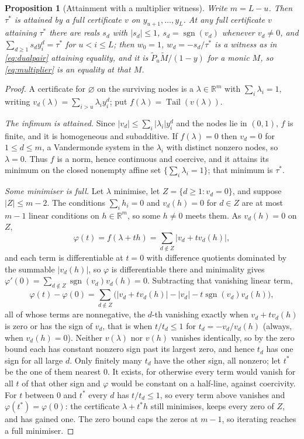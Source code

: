 \documentclass[11pt]{article}
\newtheorem{proposition}[theorem]{Proposition}
\theoremstyle{definition}
\theoremstyle{plain}
\newcommand{\R}{\mathbb R}
\DeclareMathOperator{\Tail}{Tail}
\DeclareMathOperator{\sgn}{sgn}
\begin{document}
\begin{proposition}[Attainment with a multiplier witness]\label{prop:attain}
Write $m=L-u$.  Then $\tau^*$ is attained by a full certificate $v$ on
$y_{u+1},\ldots,y_L$.  At any full certificate $v$ attaining $\tau^*$ there are reals $s_d$ with
$|s_d|\le1$, $s_d=\sgn(v_d)$ whenever $v_d\ne0$, and
$\sum_{d\ge1}s_dy_i^d=\tau^*$ for $u<i\le L$; then $w_0=1$,
$w_d=-s_d/\tau^*$ is a witness as in \eqref{eq:dualpair} attaining equality,
and it is $\widetilde P_u\widetilde M/(1-y)$ for a monic $M$, so
\eqref{eq:multiplier} is an equality at that $M$.
\end{proposition}

\begin{proof}
A certificate for $\varnothing$ on the surviving nodes is a
$\lambda\in\R^m$ with $\sum_i\lambda_i=1$, writing
$v_d(\lambda)=\sum_{i>u}\lambda_iy_i^d$; put $f(\lambda)=\Tail(v(\lambda))$.

\emph{The infimum is attained.}  Since $|v_d|\le\sum_i|\lambda_i|y_i^d$ and
the nodes lie in $(0,1)$, $f$ is finite, and it is homogeneous and
subadditive.  If $f(\lambda)=0$ then $v_d=0$ for $1\le d\le m$, a Vandermonde
system in the $\lambda_i$ with distinct nonzero nodes, so $\lambda=0$.  Thus
$f$ is a norm, hence continuous and coercive, and it attains its minimum on
the closed nonempty affine set $\{\sum_i\lambda_i=1\}$; that minimum is
$\tau^*$.

\emph{Some minimiser is full.}  Let $\lambda$ minimise, let
$Z=\{d\ge1:v_d=0\}$, and suppose $|Z|\le m-2$.  The conditions
$\sum_ih_i=0$ and $v_d(h)=0$ for $d\in Z$ are at most $m-1$ linear
conditions on $h\in\R^m$, so some $h\ne0$ meets them.  As $v_d(h)=0$ on $Z$,
\[
  \varphi(t)=f(\lambda+th)=\sum_{d\notin Z}\bigl|v_d+tv_d(h)\bigr|,
\]
and each term is differentiable at $t=0$ with difference quotients dominated
by the summable $|v_d(h)|$, so $\varphi$ is differentiable there and
minimality gives $\varphi'(0)=\sum_{d\notin Z}\sgn(v_d)v_d(h)=0$.
Subtracting that vanishing linear term,
\[
  \varphi(t)-\varphi(0)=\sum_{d\notin Z}
  \bigl(|v_d+tv_d(h)|-|v_d|-t\sgn(v_d)v_d(h)\bigr),
\]
all of whose terms are nonnegative, the $d$-th vanishing exactly when
$v_d+tv_d(h)$ is zero or has the sign of $v_d$, that is when $t/t_d\le1$ for
$t_d=-v_d/v_d(h)$ (always, when $v_d(h)=0$).  Neither $v(\lambda)$ nor
$v(h)$ vanishes identically, so by the zero bound each has constant nonzero
sign past its largest zero, and hence $t_d$ has one sign for all large $d$.
Only finitely many $t_d$ have the other sign, all nonzero; let $t^*$ be the
one of them nearest $0$.  It exists, for otherwise every term would vanish
for all $t$ of that other sign and $\varphi$ would be constant on a
half-line, against coercivity.  For $t$ between $0$ and $t^*$ every $d$ has
$t/t_d\le1$, so every term above vanishes and
$\varphi(t^*)=\varphi(0)$: the certificate $\lambda+t^*h$ still minimises,
keeps every zero of $Z$, and has gained one.  The zero bound caps the zeros
at $m-1$, so iterating reaches a full minimiser.


\end{proof}
\end{document}
